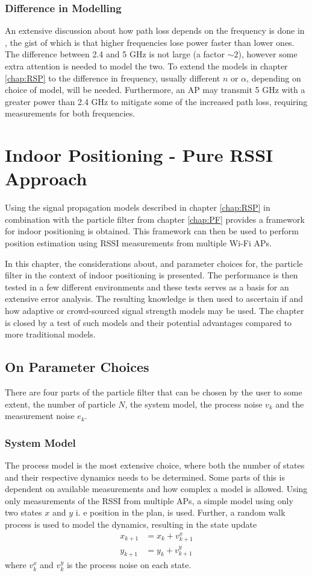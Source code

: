 \documentclass{LTHthesis}
\begin{document}
\subsection{Difference in Modelling}
%
An extensive discussion about how path loss depends on the frequency is done in \cite{rappaport96}, the gist of which is that higher frequencies lose power faster than lower ones. The difference between 2.4 and 5 GHz is not large (a factor $\sim 2$), however some extra attention is needed to model the two. To extend the models in chapter \ref{chap:RSP} to the difference in frequency, usually different $n$ or $\alpha$, depending on choice of model, will be needed. Furthermore, an AP may transmit 5 GHz with a greater power than 2.4 GHz to mitigate some of the increased path loss, requiring measurements for both frequencies.  
%
\chapter{Indoor Positioning - Pure RSSI Approach} 
%
Using the signal propagation models described in chapter \ref{chap:RSP} in combination with the particle filter from chapter \ref{chap:PF} provides a framework for indoor positioning is obtained. This framework can then be used to perform position estimation using RSSI measurements from multiple Wi-Fi APs. 

In this chapter, the considerations about, and parameter choices for, the particle filter in the context of indoor positioning is presented. The performance is then tested in a few different environments and these tests serves as a basis for an extensive error analysis. The resulting knowledge is then used to ascertain if and how adaptive or crowd-sourced signal strength models may be used. The chapter is closed by a test of such models and their potential  advantages compared to more traditional models. 
%
\section{On Parameter Choices}
%
There are four parts of the particle filter that can be chosen by the user to some extent, the number of particle $N$, the system model, the process noise $v_k$ and the measurement noise $e_k$.
%
\subsection{System Model}
%
The process model is the most extensive choice, where both the number of states and their respective dynamics needs to be determined. Some parts of this is dependent on available measurements and how complex a model is allowed. Using only measurements of the RSSI from multiple APs, a simple model using only two states $x$ and $y$ i. e position in the plan, is used. Further, a random walk process is used to model the dynamics, resulting in the state update
%
\begin{eqnarray}
x_{k+1}&=x_k + v^x_{k+1} \\
y_{k+1}&=y_k + v^y_{k+1} 
\end{eqnarray}
%
where $v^x_k$ and $v^y_k$ is the process noise on each state. 
%
\end{document}
